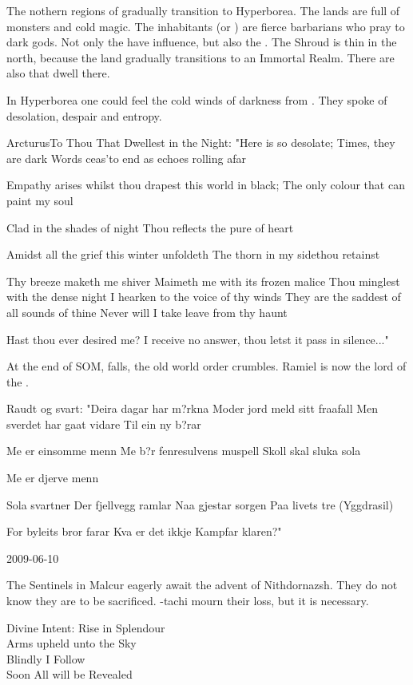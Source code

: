 The nothern regions of \Azmith gradually transition to Hyperborea.
The lands are full of monsters and cold magic.
The inhabitants (\human or \scatha) are fierce barbarians who pray to dark gods. 
Not only the \banelords have influence, but also the \xs. 
The Shroud is thin in the north, because the land gradually transitions to an Immortal Realm. 
There are also \quiljaar that dwell there. 

In Hyperborea one could feel the cold winds of darkness from \Erebos.
They spoke of desolation, despair and entropy.

Arcturus\dash{}To Thou That Dwellest in the Night:
"Here is so desolate;
Times, they are dark
Words ceas'\dash{}to end as echoes rolling afar

Empathy arises
whilst thou drapest this world in black;
The only colour that can paint my soul

Clad in the shades of night
Thou reflects the pure of heart

Amidst all the grief this winter unfoldeth
The thorn in my side\dash{}thou retainst

Thy breeze maketh me shiver
Maimeth me with its frozen malice
Thou minglest with the dense night
I hearken to the voice of thy winds
They are the saddest of all sounds of thine
Never will I take leave from thy haunt

Hast thou ever desired me?
I receive no answer, thou letst it pass in silence..."

At the end of SOM, \Miith falls, the old world order crumbles. Ramiel is now the lord of the \resphain.

Raudt og svart:
"Deira dagar har m?rkna
Moder jord meld sitt fraafall
Men sverdet har gaat vidare
Til ein ny b?rar

Me er einsomme menn
Me b?r fenresulvens muspell
Skoll skal sluka sola

Me er djerve menn

Sola svartner
Der fjellvegg ramlar
Naa gjestar sorgen
Paa livets tre (Yggdrasil)

For byleits bror farar
Kva er det ikkje Kampfar klaren?"



2009-06-10

The Sentinels in Malcur eagerly await the advent of Nithdornazsh. 
They do not know they are to be sacrificed.
\Secherdamon-tachi mourn their loss, but it is necessary.

Divine Intent:
  Rise in Splendour\\
  Arms upheld unto the Sky\\
  Blindly I Follow\\
  Soon All will be Revealed

